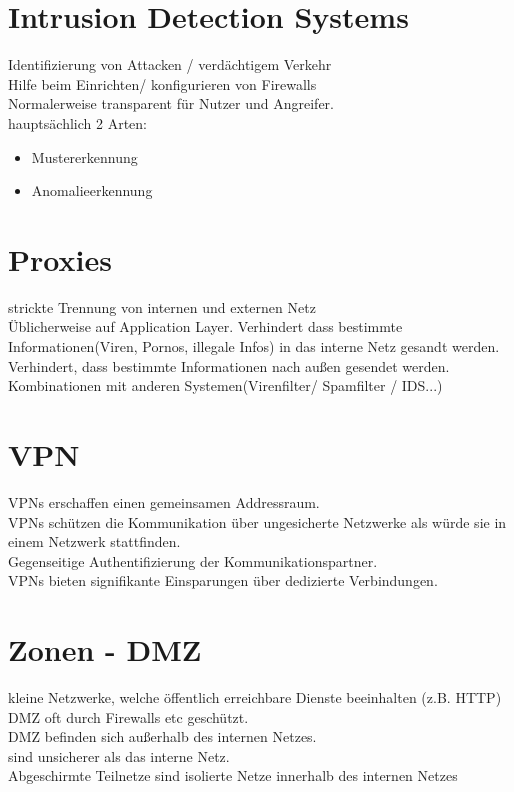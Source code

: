 \documentclass{article} %
\begin{document}
\section{Intrusion Detection Systems}
Identifizierung von Attacken / verdächtigem Verkehr \\
Hilfe beim Einrichten/ konfigurieren von Firewalls \\
Normalerweise transparent für Nutzer und Angreifer.\\
hauptsächlich 2 Arten:
\begin{itemize}
	\item Mustererkennung
    \item Anomalieerkennung
\end{itemize}
\section{Proxies}
strickte Trennung von internen und externen Netz\\
Üblicherweise auf Application Layer. Verhindert dass bestimmte Informationen(Viren, Pornos, illegale Infos) in das interne Netz gesandt werden.\\
Verhindert, dass bestimmte Informationen nach außen gesendet werden.\\
Kombinationen mit anderen Systemen(Virenfilter/ Spamfilter / IDS...)\\
\section{VPN}
VPNs erschaffen einen gemeinsamen Addressraum.\\
VPNs schützen die Kommunikation über ungesicherte Netzwerke als würde sie in einem Netzwerk stattfinden.\\
Gegenseitige Authentifizierung der Kommunikationspartner.\\
VPNs bieten signifikante Einsparungen über dedizierte Verbindungen.
\section{Zonen - DMZ}
kleine Netzwerke, welche öffentlich erreichbare Dienste beeinhalten (z.B. HTTP)\\
DMZ oft durch Firewalls etc geschützt.\\
DMZ befinden sich außerhalb des internen Netzes.\\
sind unsicherer als das interne Netz.\\
Abgeschirmte Teilnetze sind isolierte Netze innerhalb des internen Netzes
\end{document}
